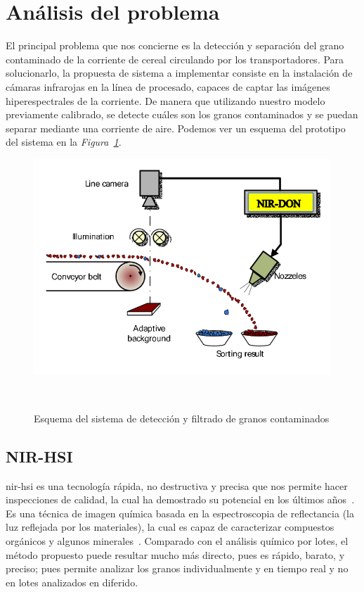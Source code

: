 \section{Análisis del problema}

El principal problema que nos concierne es la detección y separación del grano contaminado de la corriente de cereal circulando por los transportadores. Para solucionarlo,
la propuesta de sistema a implementar consiste en la instalación de cámaras infrarojas en la línea de procesado, capaces de captar las imágenes hiperespectrales de la
corriente. De manera que utilizando nuestro modelo previamente calibrado, se detecte cuáles son los granos contaminados y se puedan separar mediante una corriente de aire. 
Podemos ver un esquema del prototipo del sistema en la \textit{Figura\ \ref{fig:detection-system}}.

\begin{figure}[!h]
    \centering
    \includegraphics[width=0.7\linewidth]{media/images/esquema-del-sistema.png}
    \caption{Esquema del sistema de detección y filtrado de granos contaminados}\ \label{fig:detection-system}
\end{figure}


\subsection{NIR-HSI}


\gls{nir-hsi} es una tecnología rápida, no destructiva y precisa que nos permite hacer inspecciones de calidad, la cual ha demostrado su potencial en los últimos años\ \cite{Applicat5:online}. 
Es una técnica de imagen química basada en la espectroscopia de reflectancia (la luz reflejada por los materiales), la cual es capaz de caracterizar compuestos orgánicos y algunos minerales\ \cite{NIRHyper23:online}. Comparado con el análisis químico por lotes, el método propuesto puede resultar mucho más directo, pues es rápido, barato, y preciso; pues permite analizar los granos individualmente y en tiempo real y no en lotes analizados en diferido.

